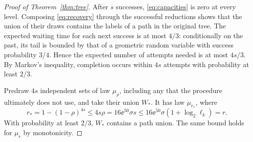 \begin{proof}[Proof of Theorem~\ref{thm:tree}]
After $s$ successes, \eqref{eq:capacities} is zero at every level.
Composing \eqref{eq:recovery} through the successful reductions shows
that the union of their draws contains the labels of a path in the
original tree. The expected waiting time for each next success is
at most $4/3$: conditionally on the past, its tail is bounded by
that of a geometric random variable with success probability $3/4$.
Hence the expected number of attempts needed is at most $4s/3$.
By Markov's inequality, completion occurs within $4s$ attempts with
probability at least $2/3$.

Predraw $4s$ independent sets of law $\mu_\rho$, including any that
the procedure ultimately does not use, and take their union $W_* $.
It has law $\mu_{r_*}$, where
\[
 r_*=1-(1-\rho)^{4s}
 \le4s\rho
 =16\ee^{50}\sigma s
 \le16\ee^{50}\sigma(1+\log_2\ell_k)=r.
\]
With probability at least $2/3$, $W_*$ contains a path union.
The same bound holds for $\mu_r$ by monotonicity.
\end{proof}

